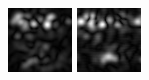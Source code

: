 \begin{figure}[ht]
\begin{center}
 \includegraphics[width=\columnwidth/9]{ch4/figures/mag_-1_3.jpg}
 \includegraphics[width=\columnwidth/9]{ch4/figures/mag_-1_4.jpg}

\end{center}
\end{figure}
